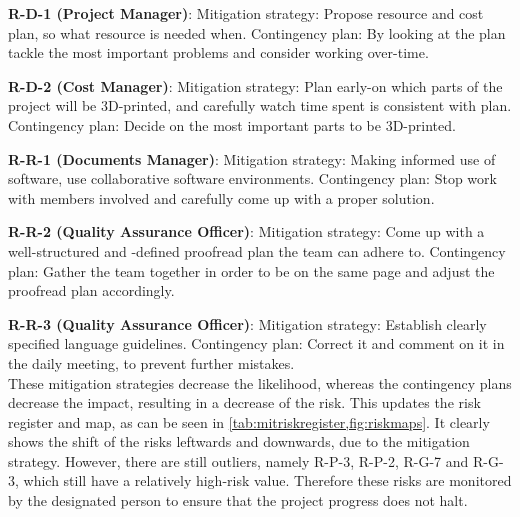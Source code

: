 \textbf{R-D-1 (Project Manager)}:
\newline Mitigation strategy: Propose resource and cost plan, so what resource is needed when.
\newline Contingency plan: By looking at the plan tackle the most important problems and consider working over-time.

\textbf{R-D-2 (Cost Manager)}:
\newline Mitigation strategy: Plan early-on which parts of the project will be 3D-printed, and carefully watch time spent is consistent with plan.
\newline Contingency plan: Decide on the most important parts to be 3D-printed.

\textbf{R-R-1 (Documents Manager)}:
\newline Mitigation strategy: Making informed use of software, use collaborative software environments.
\newline Contingency plan: Stop work with members involved and carefully come up with a proper solution.

\textbf{R-R-2 (Quality Assurance Officer)}:
\newline Mitigation strategy: Come up with a well-structured and -defined proofread plan the team can adhere to.
\newline Contingency plan: Gather the team together in order to be on the same page and adjust the proofread plan accordingly.

\textbf{R-R-3 (Quality Assurance Officer)}:
\newline Mitigation strategy: Establish clearly specified language guidelines.
\newline Contingency plan: Correct it and comment on it in the daily meeting, to prevent further mistakes.\\


These mitigation strategies decrease the likelihood, whereas the contingency plans decrease the impact, resulting in a decrease of the risk. This updates the risk register and map, as can be seen in \cref{tab:mitriskregister,fig:riskmaps}.
It clearly shows the shift of the risks leftwards and downwards, due to the mitigation strategy.
However, there are still outliers, namely R-P-3, R-P-2, R-G-7 and R-G-3, which still have a relatively high-risk value.
Therefore these risks are monitored by the designated person to ensure that the project progress does not halt.

